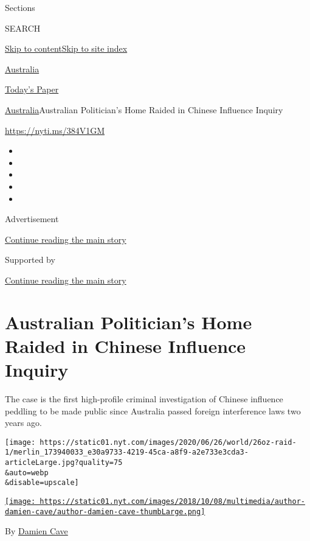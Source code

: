 Sections

SEARCH

\protect\hyperlink{site-content}{Skip to
content}\protect\hyperlink{site-index}{Skip to site index}

\href{https://www.nytimes.com/section/world/australia}{Australia}

\href{https://myaccount.nytimes.com/auth/login?response_type=cookie\&client_id=vi}{}

\href{https://www.nytimes.com/section/todayspaper}{Today's Paper}

\href{/section/world/australia}{Australia}\textbar{}Australian
Politician's Home Raided in Chinese Influence Inquiry

\url{https://nyti.ms/384V1GM}

\begin{itemize}
\item
\item
\item
\item
\item
\end{itemize}

Advertisement

\protect\hyperlink{after-top}{Continue reading the main story}

Supported by

\protect\hyperlink{after-sponsor}{Continue reading the main story}

\hypertarget{australian-politicians-home-raided-in-chinese-influence-inquiry}{%
\section{Australian Politician's Home Raided in Chinese Influence
Inquiry}\label{australian-politicians-home-raided-in-chinese-influence-inquiry}}

The case is the first high-profile criminal investigation of Chinese
influence peddling to be made public since Australia passed foreign
interference laws two years ago.

\texttt{[image: https://static01.nyt.com/images/2020/06/26/world/26oz-raid-1/merlin\_173940033\_e30a9733-4219-45ca-a8f9-a2e733e3cda3-articleLarge.jpg?quality=75\\\&auto=webp\\\&disable=upscale]}

\href{https://www.nytimes.com/by/damien-cave}{\texttt{[image: https://static01.nyt.com/images/2018/10/08/multimedia/author-damien-cave/author-damien-cave-thumbLarge.png]}}

By \href{https://www.nytimes.com/by/damien-cave}{Damien Cave}

